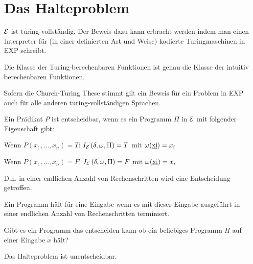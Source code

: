 \section{Das Halteproblem}\label{sec:halteproblem}
$\mathcal{E}$ ist turing-vollständig. Der Beweis dazu kann erbracht werden indem man einen 
Interpreter für (in einer definierten Art und Weise) kodierte Turingmaschinen in EXP schreibt.
\begin{defn}
Die Klasse der Turing-berechenbaren Funktionen ist genau die Klasse der intuitiv berechenbaren Funktionen.
\end{defn}
Sofern die Church-Turing These stimmt gilt ein Beweis für ein Problem in EXP auch für alle anderen turing-vollständigen Sprachen.

\begin{defn}[Entscheidungsproblem]
Ein Prädikat $P$ ist entscheidbar, wenn es ein Programm $\Pi$ in $\mathcal{E}$ mit folgender Eigenschaft gibt:
\begin{\whichitem}
\item Wenn $P(x_1,\ldots,x_n)=T$: $I_{\mathcal{E}}\left(\delta,\omega,\Pi\right)=T$ mit $\omega(\text{\underline{xi}})=x_i$
\item Wenn $P(x_1,\ldots,x_n)=F$: $I_{\mathcal{E}}\left(\delta,\omega,\Pi\right)=F$ mit $\omega(\text{\underline{xi}})=x_i$
\end{\whichitem}
D.h. in einer endlichen Anzahl von Rechenschritten wird eine Entscheidung getroffen.
\end{defn}

Ein Programm hält für eine Eingabe wenn es mit dieser Eingabe ausgeführt in einer endlichen Anzahl von Rechenschritten terminiert.

\begin{defn}[Halteproblem]
Gibt es ein Programm das entscheiden kann ob ein beliebiges Programm $\Pi$ auf einer Eingabe $x$ hält?
\end{defn}

\begin{satz}
Das Halteproblem ist unentscheidbar.
\end{satz}


